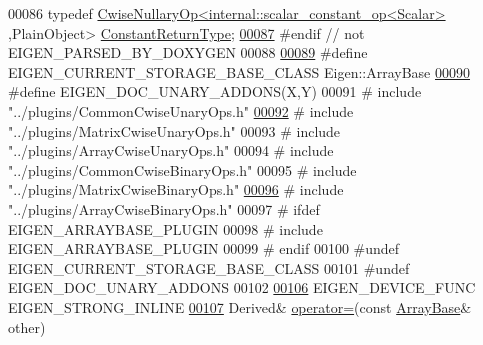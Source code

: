 \begin{DoxyCode}
00086     \textcolor{keyword}{typedef} \hyperlink{group___core___module_class_eigen_1_1_cwise_nullary_op}{CwiseNullaryOp<internal::scalar\_constant\_op<Scalar>}
      ,PlainObject> \hyperlink{group___core___module_class_eigen_1_1_cwise_nullary_op}{ConstantReturnType};
\hyperlink{group___core___module_a3c09942b87b89c06dc204fe8cf514ade}{00087} \textcolor{preprocessor}{#endif // not EIGEN\_PARSED\_BY\_DOXYGEN}
00088 
\hyperlink{group___core___module_a7b262ecb3e4db0f87d2eae85f2d64f15}{00089} \textcolor{preprocessor}{#define EIGEN\_CURRENT\_STORAGE\_BASE\_CLASS Eigen::ArrayBase}
\hyperlink{group___core___module_ad849f92841311f48355283164344c753}{00090} \textcolor{preprocessor}{#define EIGEN\_DOC\_UNARY\_ADDONS(X,Y)}
00091 \textcolor{preprocessor}{#   include "../plugins/CommonCwiseUnaryOps.h"}
\hyperlink{group___core___module_ae88791088470f8e33e903e9a46b02804}{00092} \textcolor{preprocessor}{#   include "../plugins/MatrixCwiseUnaryOps.h"}
00093 \textcolor{preprocessor}{#   include "../plugins/ArrayCwiseUnaryOps.h"}
00094 \textcolor{preprocessor}{#   include "../plugins/CommonCwiseBinaryOps.h"}
00095 \textcolor{preprocessor}{#   include "../plugins/MatrixCwiseBinaryOps.h"}
\hyperlink{group___core___module_ac0e2019654b0bf1e82ada75b3ea9e5ef}{00096} \textcolor{preprocessor}{#   include "../plugins/ArrayCwiseBinaryOps.h"}
00097 \textcolor{preprocessor}{#   ifdef EIGEN\_ARRAYBASE\_PLUGIN}
00098 \textcolor{preprocessor}{#     include EIGEN\_ARRAYBASE\_PLUGIN}
00099 \textcolor{preprocessor}{#   endif}
00100 \textcolor{preprocessor}{#undef EIGEN\_CURRENT\_STORAGE\_BASE\_CLASS}
00101 \textcolor{preprocessor}{#undef EIGEN\_DOC\_UNARY\_ADDONS}
00102 
\hyperlink{group___core___module_a7748ba1f6891fa4e10723a8bf77b8770}{00106}     EIGEN\_DEVICE\_FUNC EIGEN\_STRONG\_INLINE
\hyperlink{group___core___module_a72f5fe3d0805810e65eb897ccd3b6760}{00107}     Derived& \hyperlink{group___core___module_a72f5fe3d0805810e65eb897ccd3b6760}{operator=}(\textcolor{keyword}{const} \hyperlink{group___core___module_class_eigen_1_1_array_base}{ArrayBase}& other)

\end{DoxyCode}
